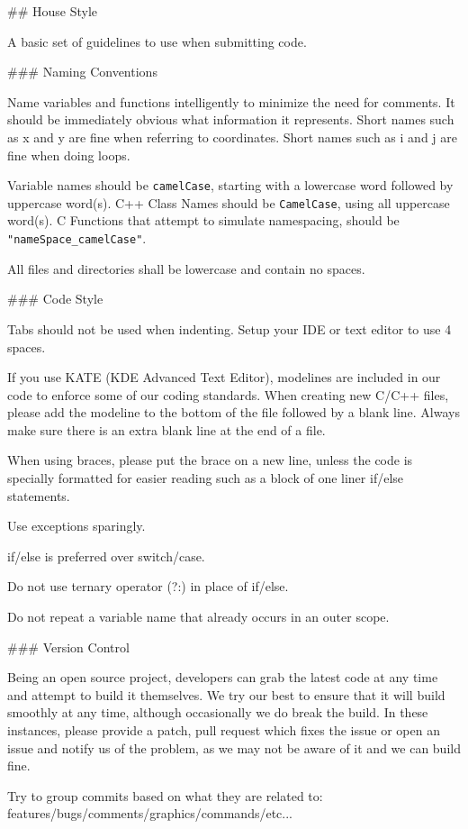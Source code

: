 ## House Style

A basic set of guidelines to use when submitting code.

### Naming Conventions

Name variables and functions intelligently to minimize the need for comments.
It should be immediately obvious what information it represents.
Short names such as x and y are fine when referring to coordinates.
Short names such as i and j are fine when doing loops.

Variable names should be \texttt{camelCase}, starting with a lowercase word followed by uppercase word(s).
C++ Class Names should be \texttt{CamelCase}, using all uppercase word(s).
C Functions that attempt to simulate namespacing, should be \texttt{"nameSpace\_camelCase"}.

All files and directories shall be lowercase and contain no spaces.

### Code Style

Tabs should not be used when indenting. Setup your IDE or text editor to use 4 spaces.

If you use KATE (KDE Advanced Text Editor), modelines are included in our code to enforce 
some of our coding standards. When creating new C/C++ files, please add
the modeline to the bottom of the file followed by a blank line. Always make sure there
is an extra blank line at the end of a file.

When using braces, please put the brace on a new line, unless the code is specially formatted
for easier reading such as a block of one liner if/else statements.

Use exceptions sparingly.

if/else is preferred over switch/case.

Do not use ternary operator (?:) in place of if/else.

Do not repeat a variable name that already occurs in an outer scope.

### Version Control

Being an open source project, developers can grab the latest code at any time
and attempt to build it themselves. We try our best to ensure that it will build smoothly
at any time, although occasionally we do break the build. In these instances,
please provide a patch, pull request which fixes the issue or open an issue and
notify us of the problem, as we may not be aware of it and we can build fine.

Try to group commits based on what they are related to: features/bugs/comments/graphics/commands/etc...

